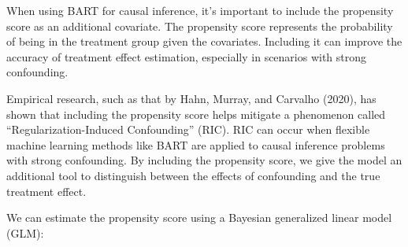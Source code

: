 \documentclass[
  letterpaper,
  DIV=11,
  numbers=noendperiod]{scrreprt}
\begin{document}
\begin{tcolorbox}[enhanced jigsaw, colframe=quarto-callout-note-color-frame, left=2mm, toprule=.15mm, colbacktitle=quarto-callout-note-color!10!white, title=\textcolor{quarto-callout-note-color}{\faInfo}\hspace{0.5em}{Tip}, coltitle=black, rightrule=.15mm, leftrule=.75mm, colback=white, arc=.35mm, bottomtitle=1mm, bottomrule=.15mm, breakable, titlerule=0mm, opacitybacktitle=0.6, toptitle=1mm, opacityback=0]

When using BART for causal inference, it's important to include the
propensity score as an additional covariate. The propensity score
represents the probability of being in the treatment group given the
covariates. Including it can improve the accuracy of treatment effect
estimation, especially in scenarios with strong confounding.

Empirical research, such as that by Hahn, Murray, and Carvalho (2020),
has shown that including the propensity score helps mitigate a
phenomenon called ``Regularization-Induced Confounding'' (RIC). RIC can
occur when flexible machine learning methods like BART are applied to
causal inference problems with strong confounding. By including the
propensity score, we give the model an additional tool to distinguish
between the effects of confounding and the true treatment effect.

\end{tcolorbox}

We can estimate the propensity score using a Bayesian generalized linear
model (GLM):
\end{document}
